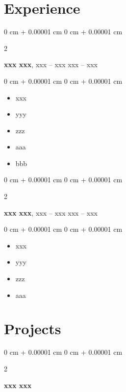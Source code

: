 \documentclass[10pt, letterpaper]{article}
\newenvironment{highlights}{
    \begin{itemize}[
        topsep=0.10 cm,
        parsep=0.10 cm,
        partopsep=0pt,
        itemsep=0pt,
        leftmargin=0 cm + 10pt
    ]
}{
    \end{itemize}
} %
\newenvironment{onecolentry}{
    \begin{adjustwidth}{
        0 cm + 0.00001 cm
    }{
        0 cm + 0.00001 cm
    }
}{
    \end{adjustwidth}
} %
\newenvironment{twocolentry}[2][]{
    \onecolentry
    \def\secondColumn{#2}
    \setcolumnwidth{\fill, 4.5 cm}
    \begin{paracol}{2}
}{
    \switchcolumn \raggedleft \secondColumn
    \end{paracol}
    \endonecolentry
} %
\begin{document}
    \section{Experience}

        \begin{twocolentry}{
            xxx – xxx
        }
            \textbf{xxx xxx}, xxx -- xxx\end{twocolentry}

        \vspace{0.10 cm}
        \begin{onecolentry}
            \begin{highlights}
                \item xxx
                \item yyy
                \item zzz
                \item aaa
                \item bbb
            \end{highlights}
        \end{onecolentry}

        \vspace{0.2 cm}

        \begin{twocolentry}{
            xxx – xxx
        }
            \textbf{xxx xxx}, xxx -- xxx\end{twocolentry}

        \vspace{0.10 cm}
        \begin{onecolentry}
            \begin{highlights}
                \item xxx
                \item yyy
                \item zzz
                \item aaa
                
            \end{highlights}
        \end{onecolentry}

    \section{Projects}

        \begin{twocolentry}{
            
        }
            \textbf{xxx xxx}\end{twocolentry}
\end{document}
